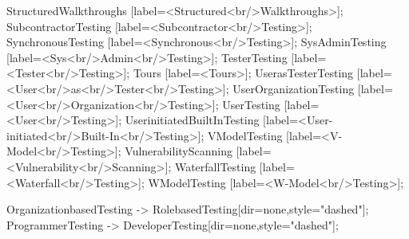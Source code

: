 \documentclass{article}
\begin{document}
{StructuredWalkthroughs [label=<Structured<br/>Walkthroughs>];
SubcontractorTesting [label=<Subcontractor<br/>Testing>];
SynchronousTesting [label=<Synchronous<br/>Testing>];
SysAdminTesting [label=<Sys<br/>Admin<br/>Testing>];
TesterTesting [label=<Tester<br/>Testing>];
Tours [label=<Tours>];
UserasTesterTesting [label=<User<br/>as<br/>Tester<br/>Testing>];
UserOrganizationTesting [label=<User<br/>Organization<br/>Testing>];
UserTesting [label=<User<br/>Testing>];
UserinitiatedBuiltInTesting [label=<User-initiated<br/>Built-In<br/>Testing>];
VModelTesting [label=<V-Model<br/>Testing>];
VulnerabilityScanning [label=<Vulnerability<br/>Scanning>];
WaterfallTesting [label=<Waterfall<br/>Testing>];
WModelTesting [label=<W-Model<br/>Testing>];

OrganizationbasedTesting -> RolebasedTesting[dir=none,style="dashed"];
ProgrammerTesting -> DeveloperTesting[dir=none,style="dashed"];

}
\end{document}
